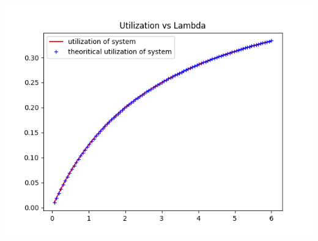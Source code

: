 \documentclass[11pt]{article}
\begin{document}
 \includegraphics{Utilization_L1_K4_M2_U3}


 
\end{document}
